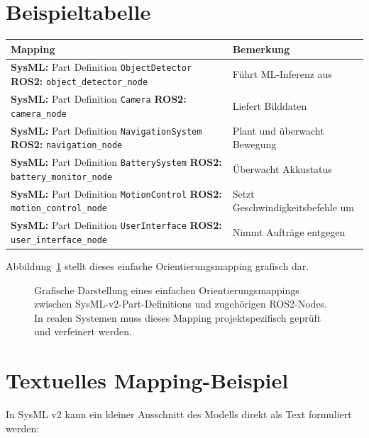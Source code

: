 \section{Beispieltabelle}
\begingroup
\small
\setlength{\tabcolsep}{4pt}
\renewcommand{\arraystretch}{1.15}
\begin{longtable}{@{}p{}p{}@{}}
\toprule
Mapping & Bemerkung\\
\midrule
\textbf{SysML:} Part Definition \texttt{ObjectDetector}\newline
\textbf{ROS2:} \texttt{object\_detector\_node} & Führt ML-Inferenz aus\\
\textbf{SysML:} Part Definition \texttt{Camera}\newline
\textbf{ROS2:} \texttt{camera\_node} & Liefert Bilddaten\\
\textbf{SysML:} Part Definition \texttt{NavigationSystem}\newline
\textbf{ROS2:} \texttt{navigation\_node} & Plant und überwacht Bewegung\\
\textbf{SysML:} Part Definition \texttt{BatterySystem}\newline
\textbf{ROS2:} \texttt{battery\_monitor\_node} & Überwacht Akkustatus\\
\textbf{SysML:} Part Definition \texttt{MotionControl}\newline
\textbf{ROS2:} \texttt{motion\_control\_node} & Setzt Geschwindigkeitsbefehle um\\
\textbf{SysML:} Part Definition \texttt{UserInterface}\newline
\textbf{ROS2:} \texttt{user\_interface\_node} & Nimmt Aufträge entgegen\\
\bottomrule
\end{longtable}
\endgroup

Abbildung~\ref{fig:kap16-mapping-sysml-ros2} stellt dieses einfache Orientierungsmapping grafisch dar.

\begin{figure}[H]
  \centering
  \caption{Grafische Darstellung eines einfachen Orientierungsmappings zwischen SysML-v2-Part-Definitions und zugehörigen ROS2-Nodes. In realen Systemen muss dieses Mapping projektspezifisch geprüft und verfeinert werden.}
  \label{fig:kap16-mapping-sysml-ros2}
\end{figure}

\section{Textuelles Mapping-Beispiel}
In SysML v2 kann ein kleiner Ausschnitt des Modells direkt als Text formuliert werden:


